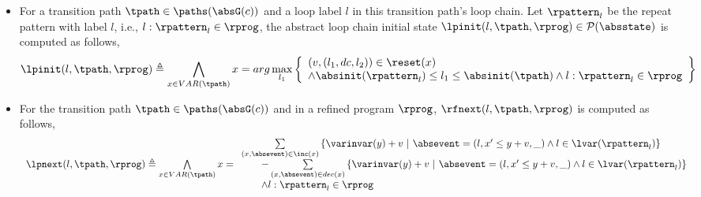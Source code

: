 \begin{enumerate}
\begin{itemize}
\item For a transition path $\tpath \in \paths(\absG(c))$ and a loop label $l$ in this transition path's loop chain.
Let $\rpattern_l$ be the repeat pattern with label $l$, i.e., $l: \rpattern_l \in \rprog$, 
the abstract loop chain initial state $\lpinit(l, \tpath, \rprog) \in \mathcal{P}(\absstate)$ is computed as follows,
\[
  \lpinit(l, \tpath, \rprog) \triangleq 
  \bigwedge_{x \in VAR(\tpath)}
  x = arg\max_{l_1}
  \left\{
      \begin{array}{l}
    (v, (l_1, dc, l_2)) \in \reset(x) 
        \\ 
    \land \absinit(\rpattern_l) \leq l_1 \leq \absinit(\tpath)
    \land l: \rpattern_l \in \rprog
    \end{array}
    \right\}
  \]
\item
For the transition path $\tpath \in \paths(\absG(c))$ and in a refined program $\rprog$,
$\rfnext(l, \tpath, \rprog)$ is computed as follows,
%
\[
  \begin{array}{l}
  \lpnext(l, \tpath, \rprog) \triangleq 
  \bigwedge\limits_{x \in VAR(\tpath)}
    x =   
    \begin{array}{l}
  \sum\limits_{(x, \absevent) \in \inc(x) }\left\{ 
    \varinvar(y) + v ~\middle\vert~ \absevent = (l, x' \leq y + v, \_) \land l \in \lvar(\rpattern_l)\right\}
    \\ \qquad 
    - \sum\limits_{(x, \absevent) \in dec(x) }\left\{ 
      \varinvar(y) + v 
      ~\middle\vert~ \absevent = (l, x' \leq y + v, \_) \land l \in \lvar(\rpattern_l) \right\}
      \\
      \qquad 
      \land l: \rpattern_l \in \rprog
    \end{array}
  \end{array}
\]
%
\end{itemize}
\end{enumerate}
%

